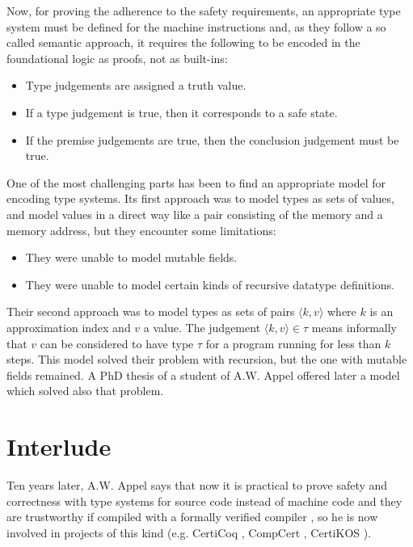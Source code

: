 \documentclass{article}
\begin{document}
Now, for proving the adherence to the safety requirements,
an appropriate type system must be defined for the machine
instructions and, as they follow a so called semantic 
approach, it requires the following to be encoded in the 
foundational logic as proofs, not as built-ins:

\begin{itemize}
  \item Type judgements are assigned a truth value.
  \item If a type judgement is true, then it corresponds
    to a safe state.
  \item If the premise judgements are true, then the 
    conclusion judgement must be true.
\end{itemize}

One of the most challenging parts has been to find an 
appropriate model for encoding type systems. Its first 
approach \cite{appel:fpcc:semantic} was to model types as 
sets of values, and model values in a direct way like a 
pair consisting of the memory and a memory address, but 
they encounter some limitations:

\begin{itemize}
  \item They were unable to model mutable fields.
  \item They were unable to model certain kinds of 
    recursive datatype definitions.
\end{itemize}

Their second approach \cite{appel:fpcc:indexed} was to 
model types as sets of pairs $\langle k, v \rangle$ where 
$k$ is an approximation index and $v$ a value. The 
judgement $\langle k, v \rangle \in \tau$ means informally 
that $v$ can be considered to have type $\tau$ for a 
program running for less than $k$ steps. This model solved 
their problem with recursion, but the one with mutable 
fields remained. A PhD thesis of a student of A.W. Appel 
offered later a model which solved also that problem. 

\section*{Interlude}

Ten years later, A.W. Appel says that now it is practical 
to prove safety and correctness with type systems for 
source code instead of machine code and they are 
trustworthy if compiled with a formally verified compiler
\cite{appel:fpcc:compilers}, so he is now involved in 
projects of this kind (e.g. CertiCoq 
\cite{website:certicoq}, CompCert \cite{website:compcert}, 
CertiKOS \cite{website:certikos}).
\end{document}
